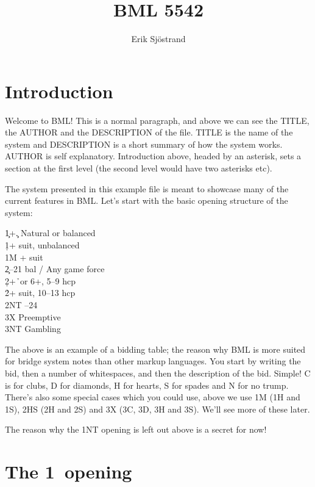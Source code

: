 \documentclass[a4paper]{article}
\title{BML 5542}
\author{Erik Sjöstrand}
\begin{document}
\maketitle
\tableofcontents

\section{Introduction}

Welcome to BML! This is a normal paragraph, and above we can see
the TITLE, the AUTHOR and the DESCRIPTION of the file. TITLE is
the name of the system and DESCRIPTION is a short summary of how
the system works. AUTHOR is self explanatory. Introduction above,
headed by an asterisk, sets a section at the first level (the second
level would have two asterisks etc).

The system presented in this example file is meant to showcase many
of the current features in BML. Let's start with the basic opening
structure of the system:

\begin{bidtable}
1\c {}+\c. Natural or balanced\\
1\d {}+ suit, unbalanced\\
1M + suit\\
2\c {}--21 bal / Any game force\\
2\d {}+\h\ or 6+\s, 5--9 hcp\\
2\h\s {}+ suit, 10--13 hcp\\
2NT --24\\
3X \> Preemptive\\
3NT \> Gambling
\end{bidtable}

The above is an example of a bidding table; the reason why BML is
more suited for bridge system notes than other markup languages. You
start by writing the bid, then a number of whitespaces, and then the
description of the bid. Simple! C is for clubs, D for diamonds, H
for hearts, S for spades and N for no trump. There's also some
special cases which you could use, above we use 1M (1H and 1S), 2HS
(2H and 2S) and 3X (3C, 3D, 3H and 3S). We'll see more of these
later.

The reason why the 1NT opening is left out above is a secret for
now!

\section{The 1\pdfc\ opening}
\end{document}
